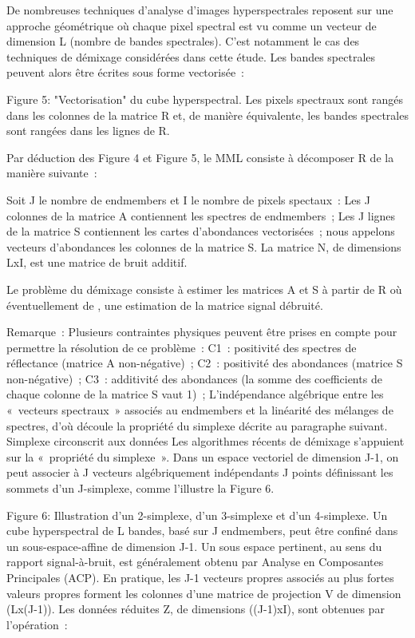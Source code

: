 De nombreuses techniques d’analyse d’images hyperspectrales reposent sur une approche géométrique où chaque pixel spectral est vu comme un vecteur de dimension L (nombre de bandes spectrales). C’est notamment le cas des techniques de démixage considérées dans cette étude. Les bandes spectrales peuvent alors être écrites sous forme vectorisée :

Figure 5: "Vectorisation" du cube hyperspectral. Les pixels spectraux sont rangés dans les colonnes de la matrice R et, de manière équivalente, les bandes spectrales sont rangées dans les lignes de R.

Par déduction des Figure 4 et Figure 5, le MML consiste à décomposer R de la manière suivante :

Soit J le nombre de endmembers et I le nombre de pixels spectaux :
Les J colonnes de la matrice A contiennent les spectres de endmembers ;
Les J lignes de la matrice S contiennent les cartes d’abondances vectorisées ; nous appelons vecteurs d’abondances les colonnes de la matrice S.
La matrice N, de dimensions LxI, est une matrice de bruit additif.

Le problème du démixage consiste à estimer les matrices A et S à partir de R où éventuellement de , une estimation de la matrice signal débruité.

Remarque :
Plusieurs contraintes physiques peuvent être prises en compte pour permettre la résolution de ce problème :
C1 : positivité des spectres de réflectance (matrice A non-négative) ;
C2 : positivité des abondances (matrice S non-négative) ;
C3 : additivité des abondances (la somme des coefficients de chaque colonne de la matrice S vaut 1) ;
L’indépendance algébrique entre les « vecteurs spectraux » associés au endmembers et la linéarité des mélanges de spectres, d’où découle la propriété du simplexe décrite au paragraphe suivant.
Simplexe circonscrit aux données
Les algorithmes récents de démixage s’appuient sur la « propriété du simplexe ». Dans un espace vectoriel de dimension J-1, on peut associer à J vecteurs algébriquement indépendants J points définissant les sommets d’un J-simplexe, comme l’illustre la Figure 6.

Figure 6: Illustration d'un 2-simplexe, d'un 3-simplexe et d'un 4-simplexe.
Un cube hyperspectral de L bandes, basé sur J endmembers, peut être confiné dans un sous-espace-affine de dimension J-1.
Un sous espace pertinent, au sens du rapport signal-à-bruit, est généralement obtenu par Analyse en Composantes Principales (ACP). En pratique, les J-1 vecteurs propres associés au plus fortes valeurs propres forment les colonnes d’une matrice de projection V de dimension (Lx(J-1)). Les données réduites Z, de dimensions ((J-1)xI), sont obtenues par l’opération :

